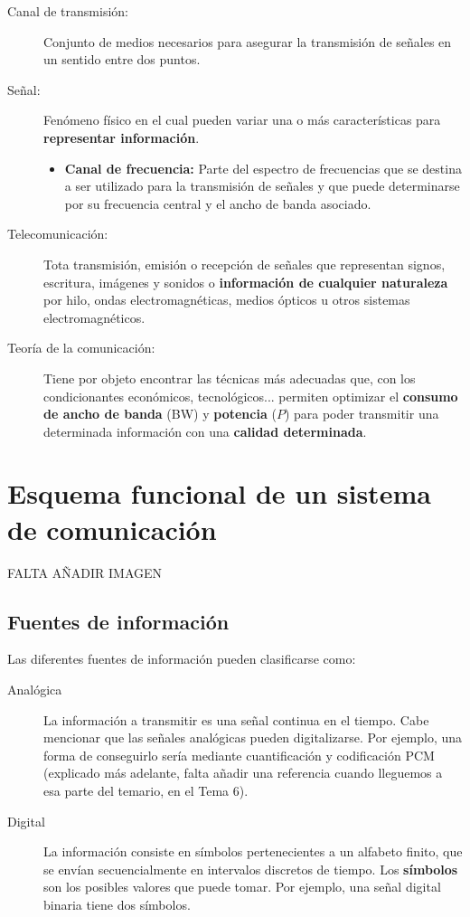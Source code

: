 \documentclass[a4paper]{book}
\begin{document}
\begin{description}
	\item[Canal de transmisión:] Conjunto de medios necesarios para asegurar la transmisión de señales en un sentido entre dos puntos.
	\item[Señal:] Fenómeno físico en el cual pueden variar una o más características para \textbf{representar información}.
	      \begin{itemize}
		      \item \textbf{Canal de frecuencia:} Parte del espectro de frecuencias que se destina a ser utilizado para la transmisión de señales y que puede determinarse por su frecuencia central y el ancho de banda asociado.
	      \end{itemize}
	\item[Telecomunicación:] Tota transmisión, emisión o recepción de señales que representan signos, escritura, imágenes y sonidos o \textbf{información de cualquier naturaleza} por hilo, ondas electromagnéticas, medios ópticos u otros sistemas electromagnéticos.
	\item[Teoría de la comunicación:] Tiene por objeto encontrar las técnicas más adecuadas que, con los condicionantes económicos, tecnológicos... permiten optimizar el \textbf{consumo de ancho de banda} (BW) y \textbf{potencia} ($P$) para poder transmitir una determinada información con una \textbf{calidad determinada}.
\end{description}

\section{Esquema funcional de un sistema de comunicación}
FALTA AÑADIR IMAGEN

\subsection{Fuentes de información}

Las diferentes fuentes de información pueden clasificarse como:
\begin{description}
	\item[Analógica] La información a transmitir es una señal continua en el tiempo. Cabe mencionar que las señales analógicas pueden digitalizarse. Por ejemplo, una forma de conseguirlo sería mediante cuantificación y codificación PCM (explicado más adelante, falta añadir una referencia cuando lleguemos a esa parte del temario, en el Tema 6).
	\item[Digital] La información consiste en símbolos pertenecientes a un alfabeto finito, que se envían secuencialmente en intervalos discretos de tiempo. Los \textbf{símbolos} son los posibles valores que puede tomar. Por ejemplo, una señal digital binaria tiene dos símbolos.
\end{description}
\end{document}
